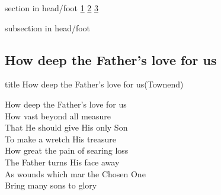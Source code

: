\documentclass{beamer}
\begin{document}
{
{ 
 {
 \begin{beamercolorbox}[ht=4.5ex,dp=1.5ex,%
      leftskip=.3cm,rightskip=.3cm plus1fil]{section in head/foot}
 \fontsize{12}{25}\selectfont 
\hyperlink{How deep the Father's love for us[](Townend)1}{1}
\hyperlink{How deep the Father's love for us[](Townend)2}{2}
\hyperlink{How deep the Father's love for us[](Townend)3}{3}
 
 \end{beamercolorbox}%
  \begin{beamercolorbox}[ht=2.5ex,dp=1.125ex,%
   leftskip=.3cm,rightskip=.3cm plus1fil]{subsection in head/foot}
   \insertauthor
 \end{beamercolorbox}%
 }
}
\subsection{ How deep the Father's love for us }

\hypertarget{How deep the Father's love for us[](Townend)}{}
\begin{frame}{}
 \vfill
  \centering
  \begin{beamercolorbox}[sep=8pt,center,shadow=true,rounded=true]{title}
    How deep the Father's love for us(Townend)    
  \end{beamercolorbox}
  \vfill
\end{frame}

\hypertarget{How deep the Father's love for us[](Townend)1}{}
\begin{frame}{}
\fontsize{ 18 }{ 23 }\selectfont

How deep the Father's love for us\\ 
How vast beyond all measure\\ 
That He should give His only Son\\ 
To make a wretch His treasure\\ 
How great the pain of searing loss\\ 
The Father turns His face away\\ 
As wounds which mar the Chosen One\\ 
Bring many sons to glory 

\end{frame}

\hypertarget{How deep the Father's love for us[](Townend)2}{}
\begin{frame}{}
\fontsize{ 18 }{ 23 }\selectfont


\end{frame}}
\end{document}
